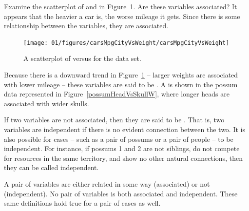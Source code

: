 \begin{example}{Examine the scatterplot of  and  in Figure~\ref{carsMpgCityVsWeight}. Are these variables associated?}
It appears that the heavier a car is, the worse mileage it gets. Since there is some relationship between the variables, they are associated.
\end{example}
\begin{figure}
   \centering
   \texttt{[image: 01/figures/carsMpgCityVsWeight/carsMpgCityVsWeight]}
   \caption{A scatterplot of  versus  for the  data set.}
   \label{carsMpgCityVsWeight}
\end{figure}

Because there is a downward trend in Figure~\ref{carsMpgCityVsWeight} --  larger weights are associated with lower mileage -- these variables are said to be . A  is shown in the possum data represented in Figure~\ref{possumHeadVsSkullW}, where longer heads are associated with wider skulls.

If two variables are not associated, then they are said to be . That is, two variables are independent if there is no evident connection between the two. %
It is also possible for cases -- such as a pair of possums or a pair of people -- to be independent. For instance, if possums 1 and 2 are not siblings, do not compete for resources in the same territory, and show no other natural connections, then they can be called independent.



\begin{termBox}{
A pair of variables are either related in some way (associated) or not (independent). No pair of variables is both associated and independent. These same definitions hold true for a pair of cases as well.}
\end{termBox}

